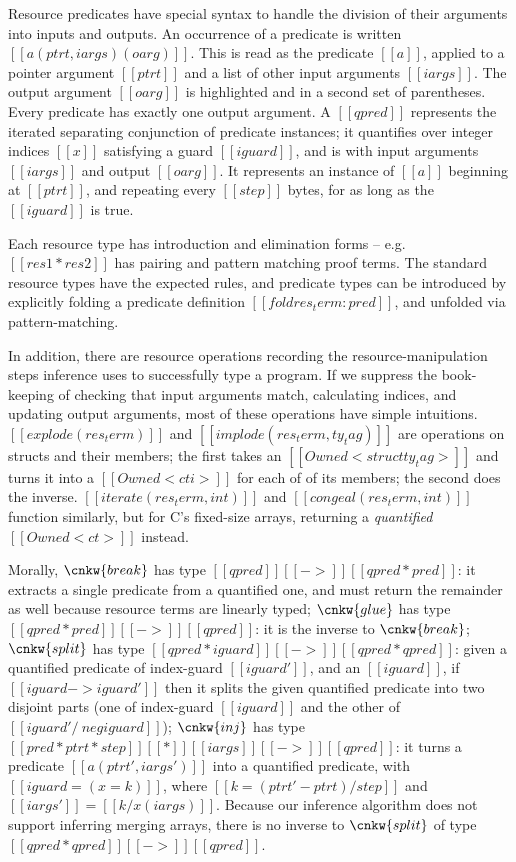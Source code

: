 \documentclass[11pt]{article}%
\begin{document}
Resource predicates have special syntax to handle the division of their
arguments into inputs and outputs. An occurrence of a predicate is written
$[[ a ( ptrt , iargs ) ( oarg )]]$. This is read as the predicate $[[ a ]]$,
applied to a pointer argument $[[ ptrt ]]$ and a list of other input arguments
$[[ iargs ]]$. The output argument $[[ oarg ]]$ is
\colorbox{red!10}{highlighted} and in a second set of parentheses. Every
predicate has exactly one output argument.
%
A $[[ qpred ]]$ represents the iterated separating conjunction of predicate
instances; it quantifies over integer indices $[[ x ]]$ satisfying a guard $[[
iguard ]]$, and is with input arguments $[[ iargs ]]$ and output $[[ oarg ]]$.
It represents an instance of $[[ a ]]$ beginning at $[[ ptrt ]]$, and repeating
every $[[ step ]]$ bytes, for as long as the $[[ iguard ]]$ is true.


Each resource type has introduction and elimination forms -- e.g.
$[[ res1 * res2 ]]$ has pairing and pattern matching proof terms. The
standard resource types have the expected rules, and predicate types
can be introduced by explicitly folding a predicate definition
$[[ fold res_term : pred ]]$, and unfolded via pattern-matching.


In addition, there are resource operations recording the
resource-manipulation steps inference uses to successfully type a
program.  If we suppress the book-keeping of checking that input
arguments match, calculating indices, and updating output arguments,
most of these operations have simple intuitions.
%
$[[ explode ( res_term ) ]]$ and $[[ implode ( res_term , ty_tag ) ]]$
are operations on structs and their members; the first takes an
$[[ Owned < struct ty_tag > ]]$ and turns it into a
$[[ Owned < cti > ]]$ for each of of its members; the second does the
inverse.  $[[ iterate ( res_term , int ) ]]$ and
$[[ congeal ( res_term , int ) ]]$ function similarly, but for C's
fixed-size arrays, returning a \emph{quantified} $[[ Owned < ct > ]]$
instead.

Morally,
$\cnkw{break}$ has type $[[ qpred ]] [[ -> ]] [[ qpred * pred ]]$: it
extracts a single predicate from a quantified one, and must return the
remainder as well because resource terms are linearly typed;
$\cnkw{glue}$ has type $[[ qpred * pred ]] [[ -> ]] [[ qpred ]]$: it
is the inverse to $\cnkw{break}$; $\cnkw{split}$ has type
$[[ qpred * iguard ]] [[ -> ]] [[ qpred * qpred ]]$: given a
quantified predicate of index-guard $[[ iguard' ]]$, and an
$[[ iguard ]]$, if $[[ iguard -> iguard' ]]$ then it splits the given
quantified predicate into two disjoint parts (one of index-guard
$[[ iguard ]]$ and the other of $[[ iguard' /\ neg iguard ]]$);
$\cnkw{inj}$ has type
$[[ pred * ptrt * step ]] [[ * ]] [[ iargs ]] [[ -> ]] [[ qpred ]]$:
it turns a predicate $[[ a ( ptrt' , iargs' ) ]]$ into a quantified
predicate, with $[[ iguard = ( x = k ) ]]$, where
$[[ k = ( ptrt' - ptrt ) / step ]]$ and
$[[ iargs' ]] = [[ k / x ( iargs ) ]]$. Because our inference
algorithm does not support inferring merging
arrays, there is no inverse to
$\cnkw{split}$ of type $[[ qpred * qpred ]] [[ -> ]] [[ qpred ]]$.
\end{document}
